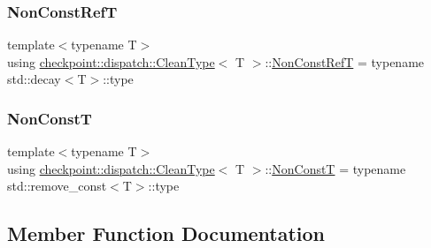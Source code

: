 \subsubsection{\texorpdfstring{Non\+Const\+RefT}{NonConstRefT}}
{\footnotesize\ttfamily template$<$typename T$>$ \\
using \hyperlink{structcheckpoint_1_1dispatch_1_1_clean_type}{checkpoint\+::dispatch\+::\+Clean\+Type}$<$ T $>$\+::\hyperlink{structcheckpoint_1_1dispatch_1_1_clean_type_a22ac8ae19000187cd7d3d218f3efa46e}{Non\+Const\+RefT} =  typename std\+::decay$<$T$>$\+::type}

\mbox{\label{structcheckpoint_1_1dispatch_1_1_clean_type_af8cc50327016b4a8410504e245edeb6f}} 
\subsubsection{\texorpdfstring{Non\+ConstT}{NonConstT}}
{\footnotesize\ttfamily template$<$typename T$>$ \\
using \hyperlink{structcheckpoint_1_1dispatch_1_1_clean_type}{checkpoint\+::dispatch\+::\+Clean\+Type}$<$ T $>$\+::\hyperlink{structcheckpoint_1_1dispatch_1_1_clean_type_af8cc50327016b4a8410504e245edeb6f}{Non\+ConstT} =  typename std\+::remove\+\_\+const$<$T$>$\+::type}



\subsection{Member Function Documentation}
\mbox{\label{structcheckpoint_1_1dispatch_1_1_clean_type_ac72dd0e6578ffb7bf75099f432271254}} 
